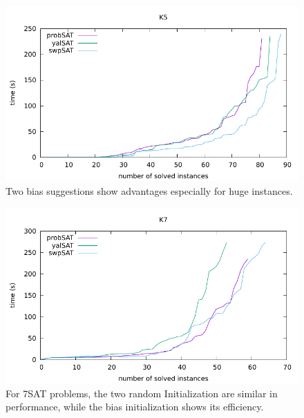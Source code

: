 \documentclass[12pt,a4paper,twoside]{scrartcl}
\numberwithin{equation}{section}
\begin{document}
  \begin{figure}[H]
\begin{center}
  \includegraphics[scale = 1]{DATA/K5/e5.pdf}
  \end{center}
  \caption{Two bias suggestions show advantages especially for huge instances.}
  \label{Experiment 9 k5 cactus plot}
  \end{figure}
  \begin{figure}[H]
\begin{center}
  \includegraphics[scale = 1]{DATA/K7/e5.pdf}
  \end{center}
  \caption{For 7SAT problems, the two random Initialization are similar in performance, while the bias initialization shows its efficiency.}
  \label{Experiment 9 k7 cactus plot}
  \end{figure} 
\end{document}
